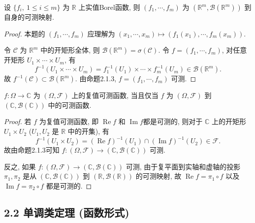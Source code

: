         \begin{6}
            设 $\{f_i,\ 1\leqslant i\leqslant m\}$ 为 $\mathbb{R}$ 上实值Borel函数, 
            则 $(f_1,\cdots,f_m)$ 为 $(\mathbb{R}^m,\mathcal{B}(\mathbb{R}^m))$ 到自身的可测映射.
        \end{6}
        \begin{proof}
            本题的 $(f_1,\cdots, f_m)$ 应理解为 $(x_1,\cdots,x_m)\mapsto (f_1(x_1),\cdots,f_m(x_m))$.

            令 $\mathcal{C}$ 为 $\mathbb{R}^m$ 中的开矩形全体, 
            则 $\mathcal{B}(\mathbb{R}^m)=\sigma(\mathcal{C})$. 
            令 $f=(f_1,\cdots,f_m)$, 
            对任意开矩形 $U_1\times \cdots \times U_m$, 
            有
            \[
                f^{-1}(U_1\times \cdots\times U_m)=f_1^{-1}(U_1)\times\cdots\times f_m^{-1}(U_m)\in\mathcal{B}(\mathbb{R}^m).
            \]
            故 $f^{-1}(\mathcal{C})\subset \mathcal{B}(\mathbb{R}^m)$. 
            由命题2.1.3, $f=(f_1,\cdots,f_m)$ 可测. 

        \end{proof}
        \begin{7}
            $f:\Omega\to\mathbb{C}$ 为 $(\Omega,\mathcal{F})$ 上的复值可测函数, 
            当且仅当 $f$ 为 $(\Omega,\mathcal{F})$ 到 $(\mathbb{C},\mathcal{B}(\mathbb{C}))$ 中的可测函数.
        \end{7}
        \begin{proof}
            若 $f$ 为复值可测函数, 
            即 $\operatorname{Re}f$ 和 $\operatorname{Im}f$都是可测的, 
            则对于 $\mathbb{C}$ 上的开矩形 $U_1\times U_2$ ($U_1,U_2$ 是 $\mathbb{R}$ 中的开集), 
            有
            \[
                f^{-1}(U_1\times U_2)=(\operatorname{Re}f)^{-1}(U_1)\cap(\operatorname{Im}f)^{-1}(U_2)\in\mathcal{F}.
            \]
            故由命题2.1.3可知 $f:(\Omega,\mathcal{F})\to(\mathbb{C},\mathcal{B}(\mathbb{C}))$ 可测.

            反之, 如果 $f:(\Omega,\mathcal{F})\to(\mathbb{C},\mathcal{B}(\mathbb{C}))$ 可测, 
            由于复平面到实轴和虚轴的投影 $\pi_1,\pi_2$ 是从 $(\mathbb{C},\mathcal{B}(\mathbb{C}))$ 到 $(\mathbb{R},\mathcal{B}(\mathbb{R}))$ 的可测映射, 
            故 $\operatorname{Re}f=\pi_1\circ f$ 以及 $\operatorname{Im}f=\pi_2\circ f$ 都是可测的.
        \end{proof}
    \subsection{2.2 单调类定理 (函数形式)}

